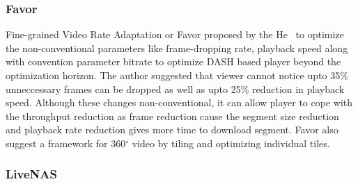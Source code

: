 \subsubsection{Favor}
Fine-grained Video Rate Adaptation or Favor\cite{10.1145/3204949.3204957} proposed by the He \etal\ to optimize the non-conventional parameters like frame-dropping rate, playback speed along with convention parameter bitrate to optimize DASH based player beyond the optimization horizon. The author suggested that viewer cannot notice upto 35\% unneccessary frames can be dropped as well as upto 25\% reduction in playback speed. Although these changes non-conventional, it can allow player to cope with the throughput reduction as frame reduction cause the segment size reduction and playback rate reduction gives more time to download segment. Favor also suggest a framework for 360$^{\circ}$ video by tiling and optimizing individual tiles.

\subsubsection{LiveNAS}
